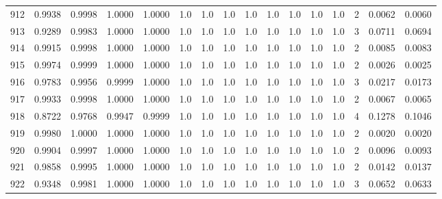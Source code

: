 \begin{tabular}{lrrrrrrrrrrrrrrr}
912 &      0.9938 &  0.9998 &  1.0000 &  1.0000 &     1.0 &     1.0 &     1.0 &     1.0 &     1.0 &     1.0 &      1.0 &        1.0 &      2 &                    0.0062 &                     0.0060 \\
913 &      0.9289 &  0.9983 &  1.0000 &  1.0000 &     1.0 &     1.0 &     1.0 &     1.0 &     1.0 &     1.0 &      1.0 &        1.0 &      3 &                    0.0711 &                     0.0694 \\
914 &      0.9915 &  0.9998 &  1.0000 &  1.0000 &     1.0 &     1.0 &     1.0 &     1.0 &     1.0 &     1.0 &      1.0 &        1.0 &      2 &                    0.0085 &                     0.0083 \\
915 &      0.9974 &  0.9999 &  1.0000 &  1.0000 &     1.0 &     1.0 &     1.0 &     1.0 &     1.0 &     1.0 &      1.0 &        1.0 &      2 &                    0.0026 &                     0.0025 \\
916 &      0.9783 &  0.9956 &  0.9999 &  1.0000 &     1.0 &     1.0 &     1.0 &     1.0 &     1.0 &     1.0 &      1.0 &        1.0 &      3 &                    0.0217 &                     0.0173 \\
917 &      0.9933 &  0.9998 &  1.0000 &  1.0000 &     1.0 &     1.0 &     1.0 &     1.0 &     1.0 &     1.0 &      1.0 &        1.0 &      2 &                    0.0067 &                     0.0065 \\
918 &      0.8722 &  0.9768 &  0.9947 &  0.9999 &     1.0 &     1.0 &     1.0 &     1.0 &     1.0 &     1.0 &      1.0 &        1.0 &      4 &                    0.1278 &                     0.1046 \\
919 &      0.9980 &  1.0000 &  1.0000 &  1.0000 &     1.0 &     1.0 &     1.0 &     1.0 &     1.0 &     1.0 &      1.0 &        1.0 &      2 &                    0.0020 &                     0.0020 \\
920 &      0.9904 &  0.9997 &  1.0000 &  1.0000 &     1.0 &     1.0 &     1.0 &     1.0 &     1.0 &     1.0 &      1.0 &        1.0 &      2 &                    0.0096 &                     0.0093 \\
921 &      0.9858 &  0.9995 &  1.0000 &  1.0000 &     1.0 &     1.0 &     1.0 &     1.0 &     1.0 &     1.0 &      1.0 &        1.0 &      2 &                    0.0142 &                     0.0137 \\
922 &      0.9348 &  0.9981 &  1.0000 &  1.0000 &     1.0 &     1.0 &     1.0 &     1.0 &     1.0 &     1.0 &      1.0 &        1.0 &      3 &                    0.0652 &                     0.0633 \\

\end{tabular}
